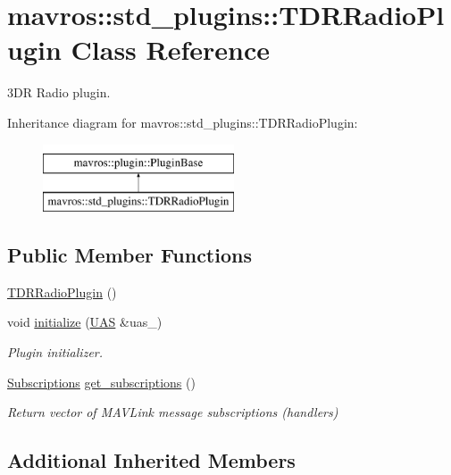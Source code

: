 \hypertarget{classmavros_1_1std__plugins_1_1TDRRadioPlugin}{}\section{mavros\+::std\+\_\+plugins\+::T\+D\+R\+Radio\+Plugin Class Reference}
\label{classmavros_1_1std__plugins_1_1TDRRadioPlugin}


3DR Radio plugin.  


Inheritance diagram for mavros\+::std\+\_\+plugins\+::T\+D\+R\+Radio\+Plugin\+:\begin{figure}[H]
\begin{center}
\leavevmode
\includegraphics[height=2.000000cm]{classmavros_1_1std__plugins_1_1TDRRadioPlugin}
\end{center}
\end{figure}
\subsection*{Public Member Functions}
\begin{DoxyCompactItemize}
\item 
\mbox{\hyperlink{group__plugin_ga8a69ef6d9829f0c1993c6b7737606106}{T\+D\+R\+Radio\+Plugin}} ()
\item 
void \mbox{\hyperlink{group__plugin_ga396d464187dbf5852122abce024b6acd}{initialize}} (\mbox{\hyperlink{classmavros_1_1UAS}{U\+AS}} \&uas\+\_\+)
\begin{DoxyCompactList}\small\item\em Plugin initializer. \end{DoxyCompactList}\item 
\mbox{\hyperlink{group__plugin_ga8967d61fc77040e0c3ea5a4585d62a09}{Subscriptions}} \mbox{\hyperlink{group__plugin_ga2cc39d74800d519194a4f65eea343f16}{get\+\_\+subscriptions}} ()
\begin{DoxyCompactList}\small\item\em Return vector of M\+A\+V\+Link message subscriptions (handlers) \end{DoxyCompactList}\end{DoxyCompactItemize}
\subsection*{Additional Inherited Members}


